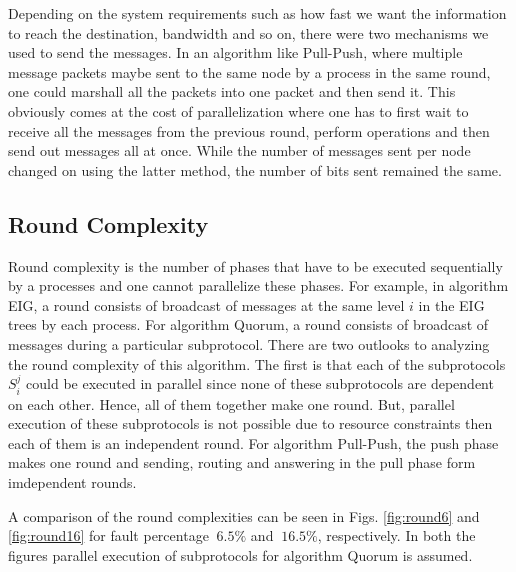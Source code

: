 Depending on the system requirements such as how fast we want the information to reach the destination, bandwidth and so on, there were two mechanisms we used to send the messages. In an algorithm like Pull-Push, where multiple message packets maybe sent to the same node by a process in the same round, one could marshall all the packets into one packet and then send it. This obviously comes at the cost of parallelization where one has to first wait to receive all the messages from the previous round, perform operations and then send out messages all at once. While the number of messages sent per node changed on using the latter method, the number of bits sent remained the same.


\subsection{Round Complexity}
Round complexity is the number of phases that have to be executed sequentially by a processes and one cannot parallelize these phases. For example, in algorithm EIG, a round consists of broadcast of messages at the same level $i$ in the EIG trees by each process. For algorithm Quorum, a round consists of broadcast of messages during a particular subprotocol. There are two outlooks to analyzing the round complexity of this algorithm. The first is that each of the subprotocols $S_i^j$ could be executed in parallel since none of these subprotocols are dependent on each other. Hence, all of them together make one round. But, parallel execution of these subprotocols is not possible due to resource constraints then each of them is an independent round. For algorithm Pull-Push, the push phase makes one round and sending, routing and answering in the pull phase form imdependent rounds.

A comparison of the round complexities can be seen in Figs. \ref{fig:round6} and \ref{fig:round16} for fault percentage $~6.5\%$ and $~16.5\%$, respectively. In both the figures parallel execution of subprotocols for algorithm Quorum is assumed. 

